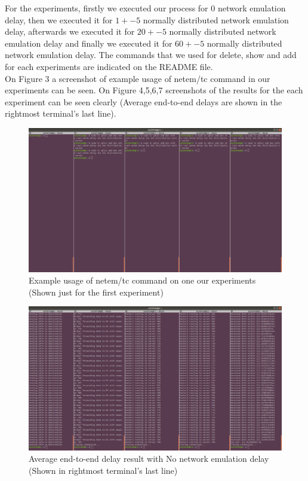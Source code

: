 \documentclass[conference]{IEEEtran}
\begin{document}
For the experiments, firstly we executed our process for $0$ network emulation delay, then we executed it for $1 +- 5$ normally distributed network emulation delay, afterwards we executed it for $20 +- 5$ normally distributed network emulation delay and finally we executed it for $60 +- 5$ normally distributed network emulation delay. The commands that we used for delete, show and add for each experiments are indicated on the README file. \\

On Figure 3 a screenshot of example usage of netem/tc command in our experiments can be seen. On Figure 4,5,6,7 screenshots of the results for the each experiment can be seen clearly (Average end-to-end delays are shown in the rightmost terminal's last line). \\

\begin{figure}
    \centering
    \includegraphics[scale=0.12]{example_tc_usage.png}
    \caption{Example usage of netem/tc command on one our experiments (Shown just for the first experiment)}
\end{figure}

\begin{figure}
    \centering
    \includegraphics[scale=0.12]{no_delay_result.png}
    \caption{Average end-to-end delay result with No network emulation delay (Shown in rightmost terminal's last line)}
\end{figure}
\end{document}
